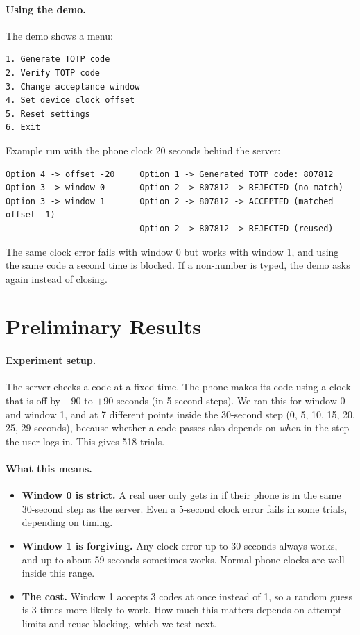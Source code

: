 \documentclass[11pt]{article}
\begin{document}
\paragraph{Using the demo.} The demo shows a menu:
\begin{lstlisting}
1. Generate TOTP code
2. Verify TOTP code
3. Change acceptance window
4. Set device clock offset
5. Reset settings
6. Exit
\end{lstlisting}
Example run with the phone clock 20 seconds behind the server:
\begin{lstlisting}
Option 4 -> offset -20     Option 1 -> Generated TOTP code: 807812
Option 3 -> window 0       Option 2 -> 807812 -> REJECTED (no match)
Option 3 -> window 1       Option 2 -> 807812 -> ACCEPTED (matched offset -1)
                           Option 2 -> 807812 -> REJECTED (reused)
\end{lstlisting}
The same clock error fails with window 0 but works with window 1, and using the
same code a second time is blocked. If a non-number is typed, the demo asks
again instead of closing.

\section{Preliminary Results}

\paragraph{Experiment setup.} The server checks a code at a fixed time. The
phone makes its code using a clock that is off by $-90$ to $+90$ seconds (in
5-second steps). We ran this for window 0 and window 1, and at 7 different
points inside the 30-second step (0, 5, 10, 15, 20, 25, 29 seconds), because
whether a code passes also depends on \emph{when} in the step the user logs
in. This gives 518 trials.

\paragraph{What this means.}
\begin{itemize}
  \item \textbf{Window 0 is strict.} A real user only gets in if their phone is
        in the same 30-second step as the server. Even a 5-second clock error
        fails in some trials, depending on timing.
  \item \textbf{Window 1 is forgiving.} Any clock error up to 30 seconds always
        works, and up to about 59 seconds sometimes works. Normal phone clocks
        are well inside this range.
  \item \textbf{The cost.} Window 1 accepts 3 codes at once instead of 1, so a
        random guess is 3 times more likely to work. How much this matters
        depends on attempt limits and reuse blocking, which we test next.
\end{itemize}
\end{document}
